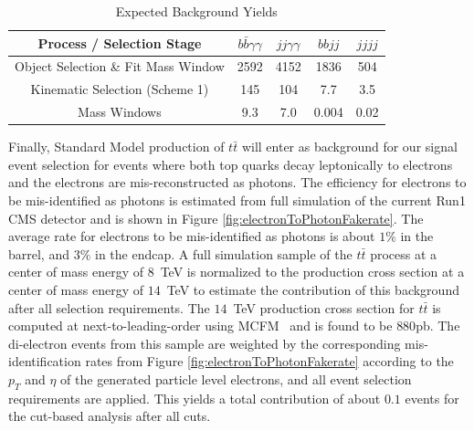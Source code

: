 \documentclass{cmspaper}
\begin{document}
\begin{table}[!ht]
\begin{center} 
\begin{tabular}{|c|c|c|c|c|}
\hline
Process / Selection Stage           &  $b \bar{b} \gamma\gamma$ & $jj \gamma\gamma$ &  $bb jj$ &  $jjjj$    \\  \hline
Object Selection \& Fit Mass Window &  2592                     &  4152             &  1836    &  504       \\ 
Kinematic Selection (Scheme 1)      &  145                      &  104              &  7.7     &  3.5       \\ 
Mass Windows                        &  9.3                      &  7.0              &  0.004   &  0.02      \\  \hline

\end{tabular}
\caption{Expected Background Yields }
\label{tab:bkgEventYields}
\end{center}
\end{table}



Finally, Standard Model production of $t\bar{t}$ will enter as background for our signal event selection
for events where both top quarks decay leptonically to electrons and the electrons are mis-reconstructed
as photons. The efficiency for electrons to be mis-identified as photons is estimated from full simulation
of the current Run1 CMS detector and is shown in Figure \ref{fig:electronToPhotonFakerate}. The average
rate for electrons to be mis-identified as photons is about $1\%$ in the barrel, and $3\%$ in the endcap.
A full simulation sample of the $t\bar{t}$ process at a center of mass energy of $8$~TeV is normalized
to the production cross section at a center of mass energy of $14$~TeV to estimate the contribution
of this background after all selection requirements. The $14$~TeV production cross section for 
$t\bar{t}$ is computed at next-to-leading-order using MCFM~\cite{MCFM} and is found to 
be $880$pb. The di-electron events from this sample are
weighted by the corresponding mis-identification rates from Figure \ref{fig:electronToPhotonFakerate}
according to the $p_{T}$ and $\eta$ of the generated particle level electrons, and all event selection
requirements are applied. This yields a total contribution of about $0.1$ events for the cut-based
analysis after all cuts.
\end{document}

